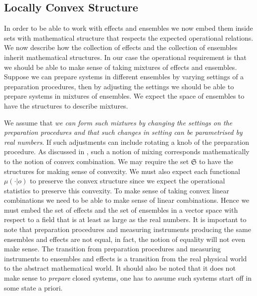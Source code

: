 \documentclass[11pt]{article}
\begin{document}
\subsection*{Locally Convex Structure}\label{LocallyConvex}
In order to be able to work with effects and ensembles we now embed them inside sets with mathematical structure that respects the expected operational relations. We now describe how the collection of effects and the collection of ensembles inherit mathematical structures. In our case the operational requirement is that we should be able to make sense of taking mixtures of effects and ensembles. Suppose we can prepare systems in different ensembles by varying settings of a preparation procedures, then by adjusting the settings we should be able to prepare systems in mixtures of ensembles. We expect the space of ensembles to have the structures to describe mixtures. 

We assume that \emph{we can form such mixtures by changing the settings on the preparation procedures and that such changes in setting can be parametrised by real numbers}. If such adjustments can include rotating a knob of the preparation procedure. As discussed in \cite{Gudder}, such a notion of mixing corresponds mathematically to the notion of convex combination. We may require the set $\mathfrak{S}$ to have the structures for making sense of convexity. We must also expect each functional $\mu(\cdot|o)$ to preserve the convex structure since we expect the operational statistics to preserve this convexity. To make sense of taking convex linear combinations we need to be able to make sense of linear combinations. Hence we must embed the set of effects and the set of ensembles in a vector space with respect to a field that is at least as large as the real numbers. It is important to note that preparation procedures and measuring instruments producing the same ensembles and effects are not equal, in fact, the notion of equality will not even make sense. The transition from preparation procedures and measuring instruments to ensembles and effects is a transition from the real physical world to the abstract mathematical world. It should also be noted that it does not make sense to \emph{prepare} closed systems, one has to assume such systems start off in some state a priori.
\end{document}
